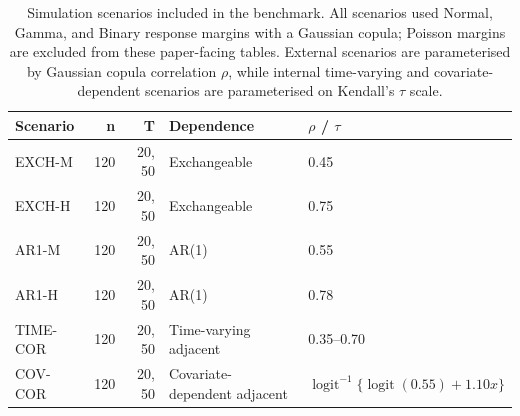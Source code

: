 
\begin{table}[htbp]
\centering
\caption{Simulation scenarios included in the benchmark. All scenarios used Normal, Gamma, and Binary response margins with a Gaussian copula; Poisson margins are excluded from these paper-facing tables. External scenarios are parameterised by Gaussian copula correlation $\rho$, while internal time-varying and covariate-dependent scenarios are parameterised on Kendall's $\tau$ scale.}
\label{tab:scenario-design}
\begin{tabular}{lrrll}
\toprule
Scenario & n & T & Dependence & $\rho$ / $\tau$ \\
\midrule
EXCH-M & 120 & 20, 50 & Exchangeable & 0.45 \\
EXCH-H & 120 & 20, 50 & Exchangeable & 0.75 \\
AR1-M & 120 & 20, 50 & AR(1) & 0.55 \\
AR1-H & 120 & 20, 50 & AR(1) & 0.78 \\
TIME-COR & 120 & 20, 50 & Time-varying adjacent & 0.35--0.70 \\
COV-COR & 120 & 20, 50 & Covariate-dependent adjacent & $\operatorname{logit}^{-1}\{\operatorname{logit}(0.55) + 1.10x\}$ \\
\bottomrule
\end{tabular}
\end{table}

